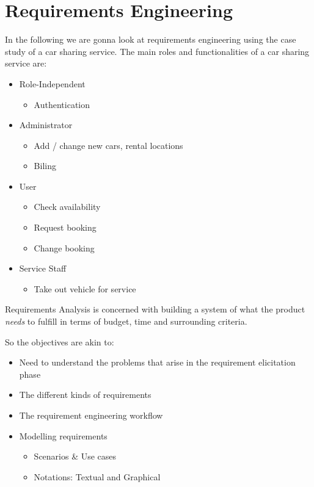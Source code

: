 \documentclass[
../../Software_Engineering_Summary.tex,
]
{subfiles}
\begin{document}
\section{Requirements Engineering}
In the following we are gonna look at requirements engineering using the case study of a car sharing service.
The main roles and functionalities of a car sharing service are:

\begin{defbox}
    \begin{itemize}
        \item Role-Independent
        \begin{itemize}
            \item Authentication
        \end{itemize}
        \item Administrator
        \begin{itemize}
            \item Add / change new cars, rental locations
            \item Biling
        \end{itemize}
        \item User
        \begin{itemize}
            \item Check availability
            \item Request booking
            \item Change booking
        \end{itemize}
        \item Service Staff
        \begin{itemize}
            \item Take out vehicle for service
        \end{itemize}
    \end{itemize}
\end{defbox}

Requirements Analysis is concerned with building a system of what the product \textit{needs} to fulfill in terms of budget, time and surrounding criteria.

So the objectives are akin to:

\begin{defbox}
    \begin{itemize}
        \item Need to understand the problems that arise in the requirement elicitation phase
        \item The different kinds of requirements
        \item The requirement engineering workflow
        \item Modelling requirements
        \begin{itemize}
            \item Scenarios \& Use cases
            \item Notations: Textual and Graphical
        \end{itemize}
    \end{itemize}
\end{defbox}
\end{document}
